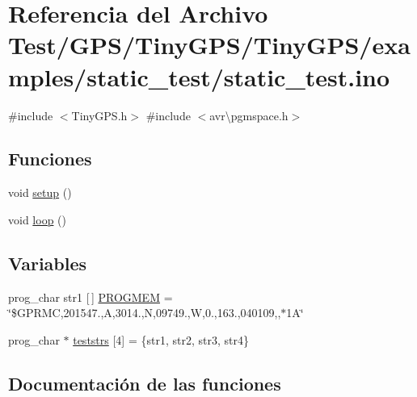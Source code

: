 \hypertarget{static__test_8ino}{}\section{Referencia del Archivo Test/\+G\+P\+S/\+Tiny\+G\+P\+S/\+Tiny\+G\+P\+S/examples/static\+\_\+test/static\+\_\+test.ino}
\label{static__test_8ino}
{\ttfamily \#include $<$Tiny\+G\+P\+S.\+h$>$}\newline
{\ttfamily \#include $<$avr\textbackslash{}pgmspace.\+h$>$}\newline
\subsection*{Funciones}
\begin{DoxyCompactItemize}
\item 
void \hyperlink{static__test_8ino_a4fc01d736fe50cf5b977f755b675f11d}{setup} ()
\item 
void \hyperlink{static__test_8ino_afe461d27b9c48d5921c00d521181f12f}{loop} ()
\end{DoxyCompactItemize}
\subsection*{Variables}
\begin{DoxyCompactItemize}
\item 
prog\+\_\+char str1 \mbox{[}$\,$\mbox{]} \hyperlink{static__test_8ino_a37dd2e5939ed07e6228272db05427f31}{P\+R\+O\+G\+M\+EM} = \char`\"{}\$G\+P\+R\+MC,201547.,A,3014.,N,09749.,W,0.,163.,040109,,$\ast$1\+A\char`\"{}
\item 
prog\+\_\+char $\ast$ \hyperlink{static__test_8ino_a0a3cd97c1566952d62849717668e2174}{teststrs} \mbox{[}4\mbox{]} = \{str1, str2, str3, str4\}
\end{DoxyCompactItemize}


\subsection{Documentación de las funciones}
\mbox{\label{static__test_8ino_afe461d27b9c48d5921c00d521181f12f}} 

